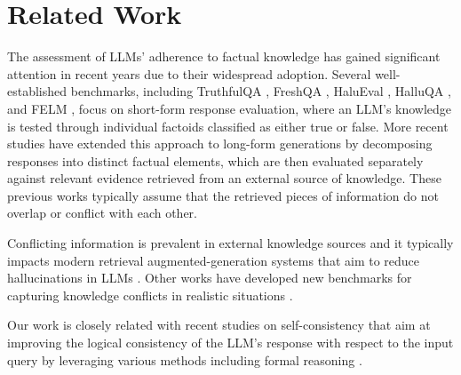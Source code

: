 \section{Related Work}
\label{sec-related}

The assessment of LLMs' adherence to factual knowledge has gained significant attention in recent years due to their widespread adoption. Several well-established benchmarks, including TruthfulQA \cite{lin2022truthfulqa}, FreshQA \cite{vu2023freshllms}, HaluEval \cite{li2023halueval}, HalluQA \cite{cheng2023evaluating}, and FELM \cite{chen2023felm}, focus on short-form response evaluation, where an LLM’s knowledge is tested through individual factoids classified as either true or false. More recent studies \cite{factscore2023emnlp,wei2024longform,bayat2025factbench,song2024veriscore} have extended this approach to long-form generations by decomposing responses into distinct factual elements, which are then evaluated separately against relevant evidence retrieved from an external source of knowledge. These previous works typically assume that the retrieved pieces of information do not overlap or conflict with each other. 

Conflicting information is prevalent in external knowledge sources \cite{xu2024knowledge} and it typically impacts modern retrieval augmented-generation systems that aim to reduce hallucinations in LLMs \cite{lewis2021retrievalaugmented}. Other works have developed new benchmarks for capturing knowledge conflicts in realistic situations \cite{hou2024wiki,marjanovic2024dynamicqa,su2024conflictbank,pham2024s}. 

Our work is closely related with recent studies on self-consistency that aim at improving the logical consistency of the LLM's response with respect to the input query by leveraging various methods including formal reasoning
\cite{wang2023selfconsistency,dohan2022language,mitchell2022concord}.
